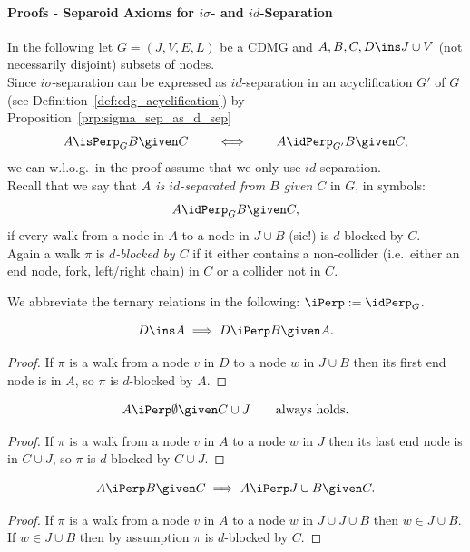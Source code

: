\paragraph{Proofs - Separoid Axioms for $i\sigma$- and $id$-Separation}\hfill%

In the following let $G=(J,V,E,L)$ be a CDMG and $A,B,C,D \ins J \cup V$
(not necessarily disjoint) subsets of nodes.\\
Since $i\sigma$-separation can be expressed as $id$-separation in an acyclification $G'$
of $G$ (see Definition~\ref{def:cdg_acyclification}) by Proposition~\ref{prp:sigma_sep_as_d_sep}
\[ A \isPerp_G B \given C  \qquad\iff\qquad A \idPerp_{G'} B \given C, \]
we can w.l.o.g.\ in the proof assume that we only use $id$-separation.\\

Recall that we say that \emph{$A$ is $id$-separated from $B$ given $C$} in $G$, in symbols:
    \[ A \idPerp_G B \given C, \]
 if every walk from a node in $A$ to a node in $J \cup B$ (sic!) is $d$-blocked by $C$. \\
 Again a walk $\pi$ is \emph{$d$-blocked by $C$} if it either contains a non-collider 
 (i.e.\ either an end node, fork, left/right chain) in $C$ or a collider not in $C$.

 We abbreviate the ternary relations in the following: $\displaystyle \iPerp := \idPerp_G$.


\begin{Lem}
    \[D \ins A \implies D \iPerp  B \given A.\]
\begin{proof}
    If $\pi$ is a walk from a node $v$ in $D$ to a node $w$ in $J \cup B$ then its first end node is in $A$, so $\pi$ is $d$-blocked by $A$.
\end{proof}
\end{Lem}

\begin{Lem}
    \label{d-sep-restricted-right-redundancy}
    \[A \iPerp  \emptyset \given C \cup J \qquad \text{always holds.}\]
\begin{proof}
    If $\pi$ is a walk from a node $v$ in $A$ to a node $w$ in $J$ then its last end node is in $C \cup J$, so $\pi$ is $d$-blocked by $C \cup J$.
\end{proof}
\end{Lem}


\begin{Lem}
    \[A \iPerp  B \given C \implies A \iPerp  J \cup B \given C.\]
\begin{proof}
 If $\pi$ is a walk from a node $v$ in $A$ to a node $w$ in $J \cup J \cup B$ then $w \in J \cup B$. %
 If $w \in J \cup B$ then by assumption $\pi$ is $d$-blocked by $C$.
\end{proof}
\end{Lem}

